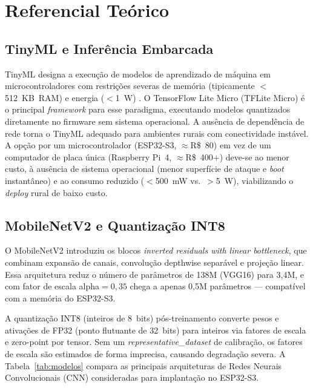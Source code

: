\documentclass[12pt]{article}
\begin{document}
\section{Referencial Teórico}

\subsection{TinyML e Inferência Embarcada}

TinyML designa a execução de modelos de aprendizado de máquina em
microcontroladores com restrições severas de memória (tipicamente $<$512~KB~RAM)
e energia ($<$1~W) \cite{warden2019}. O TensorFlow Lite Micro (TFLite Micro) é o
principal \textit{framework} para esse paradigma, executando modelos quantizados
diretamente no firmware sem sistema operacional. A ausência de dependência de rede
torna o TinyML adequado para ambientes rurais com conectividade instável.
A opção por um microcontrolador (ESP32-S3, $\approx$R\$~80) em vez de um computador
de placa única (Raspberry Pi~4, $\approx$R\$~400$+$) deve-se ao menor custo, à
ausência de sistema operacional (menor superfície de ataque e \textit{boot}
instantâneo) e ao consumo reduzido ($<$500~mW vs.\ $>$5~W), viabilizando o
\textit{deploy} rural de baixo custo.

\subsection{MobileNetV2 e Quantização INT8}

O MobileNetV2 \cite{howard2017,sandler2018} introduziu os blocos
\textit{inverted residuals with linear bottleneck}, que combinam expansão de
canais, convolução depthwise separável e projeção linear. Essa arquitetura reduz
o número de parâmetros de 138M (VGG16) para 3,4M, e com fator de escala
alpha$=0{,}35$ chega a apenas 0,5M parâmetros --- compatível com a memória do
ESP32-S3.

A quantização INT8 (inteiros de 8~bits) pós-treinamento \cite{jacob2018} converte
pesos e ativações de FP32 (ponto flutuante de 32~bits) para inteiros via fatores de
escala e zero-point por tensor. Sem um
\textit{representative\_dataset} de calibração, os fatores de escala são estimados
de forma imprecisa, causando degradação severa. A Tabela~\ref{tab:modelos} compara
as principais arquiteturas de Redes Neurais Convolucionais (CNN) consideradas para
implantação no ESP32-S3.
\end{document}
